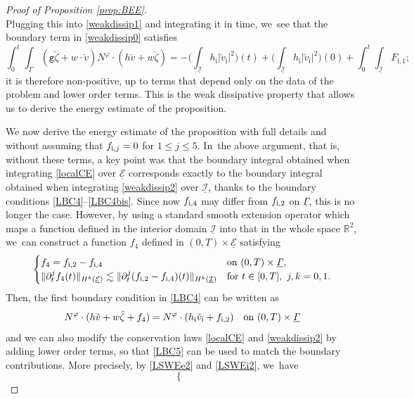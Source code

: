 \documentclass[JEP,XML,SOM,Unicode,NoFloatCountersInSection,published]{cedram}
\newcommand{\abs}[1]{\vert#1\vert}
\newcommand{\gr}{{\mathtt g}}
\newcommand{\R}{{\mathbb R}}
\newcommand{\dt}{\partial_t}
\newcommand{\cI}{{\mathcal I}}
\newcommand{\cE}{{\mathcal E}}
\newcommand{\ul}[1]{\underline{#1}}
\newcommand{\itGamma}{\mathit{\Gamma}}
\theoremstyle{definition}
\begin{document}
\begin{proof}[Proof of Proposition \ref{prop:BEE}]
\[\]
Plugging this into \eqref{weakdissip1} and integrating it in time, we~see that the boundary term in \eqref{weakdissip0} satisfies
\[
\int_0^t \int_{\ul\itGamma} (\gr\check{\zeta}+w\cdot\check{v}) N^\varphi\cdot (h\check{v}+w\check{\zeta})
= - \bigl(\int_{\ul{\cI}} h_\mathrm{i}\abs{\check{v}_\mathrm{i}}^2\bigr)(t)
+ \bigl(\int_{\ul{\cI}} h_\mathrm{i}\abs{\check{v}_\mathrm{i}}^2\bigr)(0)+\int_0^t \int_{\ul{\cI}}F_\mathrm{i,1};
\]
it is therefore non-positive, up to terms that depend only on the data of the problem and lower order terms.
This is the weak dissipative property that allows us to derive the energy estimate of the proposition.

We now derive the energy estimate of the proposition with full details and without assuming that $f_{{\rm i},j}=0$ for $1\leq j\leq 5$. In~the above argument, that is, without these terms, a key point was that the boundary integral obtained when integrating \eqref{localCE} over $\ul{\cE}$
corresponds exactly to the boundary integral obtained when integrating \eqref{weakdissip2} over $\ul{\cI}$,
thanks to the boundary conditions \eqref{LBC4}--\eqref{LBC4bis}.
Since now $f_{{\rm i},4}$ may differ from $f_{{\rm i},2}$ on $\ul{\itGamma}$, this is no longer the case.
However, by using a standard smooth extension operator which maps a function defined in the interior domain $\ul{\cI}$ into that in the whole space $\R^2$, we~can construct a function $f_4$ defined in $(0,T)\times\ul{\cE}$ satisfying
\begin{equation}\label{Ext1}
\begin{cases}
f_4 = f_{{\rm i},2}-f_{{\rm i},4} &\text{on } (0,T)\times\ul{\itGamma}, \\
\|\dt^jf_4(t)\|_{H^k(\ul{\cE})} \lesssim \|\dt^j(f_{{\rm i},2}-f_{{\rm i},4})(t)\|_{H^k(\ul{\cI})} &\text{for } t\in[0,T], \ j,k=0,1.
\end{cases}
\end{equation}
Then, the first boundary condition in \eqref{LBC4} can be written as
\begin{equation}\label{LBC5}
N^\varphi\cdot(h\check{v}+w\check{\zeta}+f_4) = N^\varphi\cdot(h_\mathrm{i}\check{v}_\mathrm{i}+f_{{\rm i},2}) \quad\text{on } (0,T)\times\ul{\itGamma}
\end{equation}
and we can also modify the conservation laws \eqref{localCE} and \eqref{weakdissip2} by adding lower order terms,
so that \eqref{LBC5} can be used to match the boundary contributions.
More precisely, by \eqref{LSWEe2} and \eqref{LSWEi2}, we~have
\[
\begin{cases}

\end{cases}\]
\end{proof}
\end{document}
